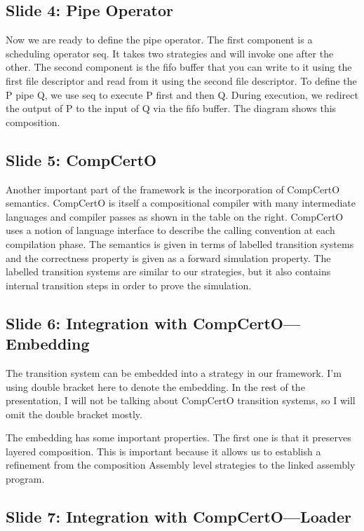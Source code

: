\documentclass{article}
\begin{document}
\subsection{Slide 4: Pipe Operator}

Now we are ready to define the pipe operator. The first component is a
scheduling operator seq. It takes two strategies and will invoke one after the
other. The second component is the fifo buffer that you can write to it using
the first file descriptor and read from it using the second file descriptor. To
define the P pipe Q, we use seq to execute P first and then Q. During execution,
we redirect the output of P to the input of Q via the fifo buffer. The diagram
shows this composition.

\subsection{Slide 5: CompCertO}

Another important part of the framework is the incorporation of CompCertO
semantics. CompCertO is itself a compositional compiler with many intermediate
languages and compiler passes as shown in the table on the right. CompCertO uses
a notion of language interface to describe the calling convention at each
compilation phase. The semantics is given in terms of labelled transition
systems and the correctness property is given as a forward simulation property.
The labelled transition systems are similar to our strategies, but it also
contains internal transition steps in order to prove the simulation.

\subsection{Slide 6: Integration with CompCertO---Embedding}

The transition system can be embedded into a strategy in our framework. I'm
using double bracket here to denote the embedding. In the rest of the
presentation, I will not be talking about CompCertO transition systems, so I
will omit the double bracket mostly.

The embedding has some important properties. The first one is that it preserves
layered composition. This is important because it allows us to establish a
refinement from the composition Assembly level strategies to the linked assembly
program.

\subsection{Slide 7: Integration with CompCertO---Loader}
\end{document}
